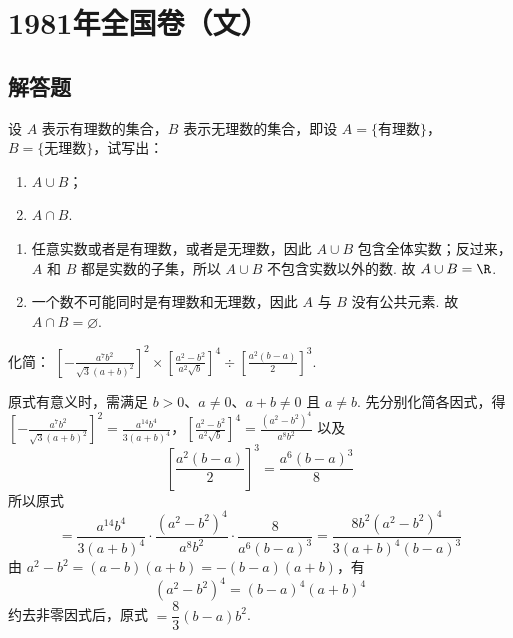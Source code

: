 \chapter{1981年全国卷（文）}

\section{解答题}

\begin{problem}
设 \(A\) 表示有理数的集合，\(B\) 表示无理数的集合，即设 \(A = \{\text{有理数}\}\)，\(B = \{\text{无理数}\}\)，试写出：

\begin{enumerate}
\item \(A \cup B\)；
\item \(A \cap B\).
\end{enumerate}
\end{problem}

\begin{solution}
\begin{enumerate}
\item 任意实数或者是有理数，或者是无理数，因此 \(A\cup B\) 包含全体实数；反过来，\(A\) 和 \(B\) 都是实数的子集，所以 \(A\cup B\) 不包含实数以外的数. 故 \(A\cup B=\R\).
\item 一个数不可能同时是有理数和无理数，因此 \(A\) 与 \(B\) 没有公共元素. 故 \(A\cap B=\varnothing\).
\end{enumerate}
\end{solution}

\begin{problem}
化简： \(\left[-\frac{a^7b^2}{\sqrt{3}(a+b)^2}\right]^2\times \left[\frac{a^2-b^2}{a^2\sqrt{b}}\right]^4\div \left[\frac{a^2(b-a)}{2}\right]^3\).
\end{problem}

\begin{solution}
原式有意义时，需满足 \(b>0\)、\(a\ne0\)、\(a+b\ne0\) 且 \(a\ne b\). 先分别化简各因式，得
\(\left[-\frac{a^7b^2}{\sqrt{3}(a+b)^2}\right]^2=\frac{a^{14}b^4}{3(a+b)^4}\)，\(\left[\frac{a^2-b^2}{a^2\sqrt b}\right]^4=\frac{(a^2-b^2)^4}{a^8b^2}\)
以及
\[
\left[\frac{a^2(b-a)}{2}\right]^3=\frac{a^6(b-a)^3}{8}
\]
所以原式
\[
=\frac{a^{14}b^4}{3(a+b)^4}\cdot\frac{(a^2-b^2)^4}{a^8b^2}\cdot\frac{8}{a^6(b-a)^3}
=\frac{8b^2(a^2-b^2)^4}{3(a+b)^4(b-a)^3}
\]
由 \(a^2-b^2=(a-b)(a+b)=-(b-a)(a+b)\)，有
\[
(a^2-b^2)^4=(b-a)^4(a+b)^4
\]
约去非零因式后，原式 \(=\dfrac{8}{3}(b-a)b^2\).
\end{solution}


